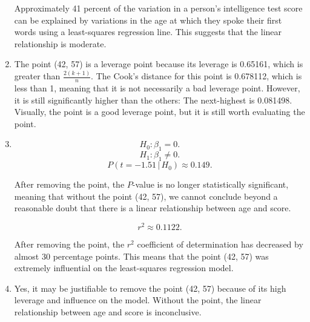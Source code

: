 \documentclass[12pt]{article}
\begin{document}
\begin{enumerate}
Approximately 41 percent of the variation in a person's intelligence test score can be explained by variations in the age at which they spoke their first words using a least-squares regression line. This suggests that the linear relationship is moderate.
\item The point (42, 57) is a leverage point because its leverage is 0.65161, which is greater than $\frac{2(k+1)}{n}$. The Cook's distance for this point is 0.678112, which is less than 1, meaning that it is not necessarily a bad leverage point. However, it is still significantly higher than the others: The next-highest is 0.081498. Visually, the point is a good leverage point, but it is still worth evaluating the point.
\item 
\[H_0:\beta_1=0.\]
\[H_1:\beta_1\neq 0.\]
\[P(t=-1.51\,|\,H_0)\approx 0.149.\]

After removing the point, the $P$-value is no longer statistically significant, meaning that without the point (42, 57), we cannot conclude beyond a reasonable doubt that there is a linear relationship between age and score.

\[r^2\approx 0.1122.\]

After removing the point, the $r^2$ coefficient of determination has decreased by almost 30 percentage points. This means that the point (42, 57) was extremely influential on the least-squares regression model.
\item Yes, it may be justifiable to remove the point (42, 57) because of its high leverage and influence on the model. Without the point, the linear relationship between age and score is inconclusive.
\end{enumerate}
\end{document}
